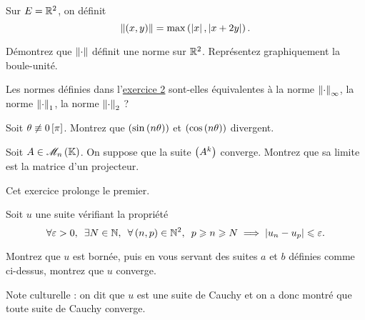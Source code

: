 \begin{exos}[Exercice 3]
Sur \(E=\mathbb{R}^2\), on définit \[\left\|\left(x,y\right)\right\|=\max\left(\left\lvert x\right\rvert,\left\lvert x+2y\right\rvert\right).\]

Démontrez que \(\left\|\cdot\right\|\) définit une norme sur \(\mathbb{R}^2\). Représentez graphiquement la boule-unité.
\end{exos}

\begin{corr}
\end{corr}

\begin{exopss}[Exercice 4]
Les normes définies dans l'\hyperref[exo:1.2]{exercice 2} sont-elles équivalentes à la norme \(\left\|\cdot\right\|_\infty\), la norme \(\left\|\cdot\right\|_1\), la norme \(\left\|\cdot\right\|_2\) ?
\end{exopss}

\begin{corr}
\end{corr}

\begin{exops}[Exercice 5]
Soit \(\theta\not\equiv0\left[\pi\right]\). Montrez que \(\left(\sin\left(n\theta\right)\right)\) et \(\left(\cos\left(n\theta\right)\right)\) divergent.
\end{exops}

\begin{corr}
\end{corr}

\begin{exops}[Exercice 6]
Soit \(A\in\M{n}\). On suppose que la suite \(\left(A^k\right)\) converge. Montrez que sa limite est la matrice d'un projecteur.
\end{exops}

\begin{corr}
\end{corr}

\begin{exoss}[Exercice 7]
Cet exercice prolonge le premier.

Soit \(u\) une suite vérifiant la propriété \[\quantifs{\forall\epsilon>0;\exists N\in\N;\forall\paren{n,p}\in\N^2}p\geq n\geq N\imp\abs{u_n-u_p}\leq\epsilon.\]

Montrez que \(u\) est bornée, puis en vous servant des suites \(a\) et \(b\) définies comme ci-dessus, montrez que \(u\) converge.

Note culturelle : on dit que \(u\) est une suite de Cauchy et on a donc montré que toute suite de Cauchy converge.
\end{exoss}

